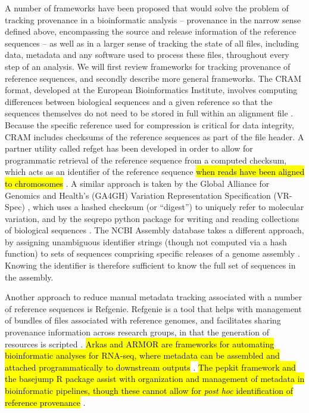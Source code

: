 A number of frameworks have been proposed that would solve the problem
of tracking provenance in a bioinformatic analysis -- provenance in
the narrow sense defined above, encompassing the source and release
information of the reference sequences -- as well as in a larger sense
of tracking the state of all files, including data, metadata and
any software used to process these files, throughout every step of an
analysis. We will first review frameworks for tracking provenance of
reference sequences, and secondly describe more general
frameworks. The CRAM format, developed at the European Bioinformatics
Institute, involves computing differences between biological sequences
and a given reference so that the sequences themselves do not need to
be stored in full within an alignment file \cite{cram}. Because the
specific reference used for compression is critical for data
integrity, CRAM includes checksums of the reference sequences as part
of the file header. A partner utility called refget has been developed
in order to allow for programmatic retrieval of the reference sequence
from a computed checksum, which acts as an identifier of the reference
sequence
\hl{when reads have been aligned to chromosomes} \cite{refget}.
A similar approach is taken by the Global
Alliance for Genomics and Health's (GA4GH) Variation Representation
Specification (VR-Spec) \cite{vr}, which uses a hashed checksum (or
``digest'') to uniquely refer to molecular variation, and by the
seqrepo python package for writing and reading collections of
biological sequences \cite{seqrepo}. The NCBI Assembly database takes
a different approach, by assigning unambiguous identifier strings
(though not computed via a hash function) to sets of sequences
comprising specific releases of a genome assembly
\cite{ncbi-assembly}. Knowing the identifier is therefore sufficient
to know the full set of sequences in the assembly.

Another approach to reduce manual metadata tracking associated with a
number of reference sequences is Refgenie. Refgenie is a tool that
helps with management of bundles of files associated with reference
genomes, and facilitates sharing provenance information across
research groups, in that the generation of resources is scripted
\cite{refgenie}.
\hl{Arkas and ARMOR are 
frameworks for automating bioinformatic analyses for RNA-seq, where
metadata can be assembled and attached programmatically to downstream
outputs} \cite{arkas,Orjuelag2019}. 
\hl{The pepkit framework and the basejump R package assist with
organization and management of metadata in bioinformatic pipelines,
though these cannot allow for \textit{post hoc} identification of
reference provenance} \cite{pepkit, basejump}.

